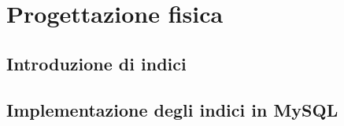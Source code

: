 \chapter{Progettazione fisica}
\section{Introduzione di indici}
\section{Implementazione degli indici in MySQL}
